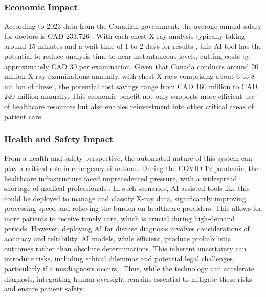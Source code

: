 \documentclass[12pt]{article}
\begin{document}
\subsubsection{Economic Impact}
According to 2023 data from the Canadian government, the average annual salary for doctors is CAD 233,726 \cite{2}. With each chest X-ray analysis typically taking around 15 minutes and a wait time of 1 to 2 days for results \cite{1}, this AI tool has the potential to reduce analysis time to near-instantaneous levels, cutting costs by approximately CAD 30 per examination. Given that Canada conducts around 20 million X-ray examinations annually, with chest X-rays comprising about 6 to 8 million of these \cite{3}, the potential cost savings range from CAD 160 million to CAD 240 million annually. This economic benefit not only supports more efficient use of healthcare resources but also enables reinvestment into other critical areas of patient care.

\subsubsection{Health and Safety Impact}
From a health and safety perspective, the automated nature of this system can play a critical role in emergency situations. During the COVID-19 pandemic, the healthcare infrastructure faced unprecedented pressure, with a widespread shortage of medical professionals \cite{4}. In such scenarios, AI-assisted tools like this could be deployed to manage and classify X-ray data, significantly improving processing speed and relieving the burden on healthcare providers. This allows for more patients to receive timely care, which is crucial during high-demand periods.
\newline
However, deploying AI for disease diagnosis involves considerations of accuracy and reliability. AI models, while efficient, produce probabilistic outcomes rather than absolute determinations. This inherent uncertainty can introduce risks, including ethical dilemmas and potential legal challenges, particularly if a misdiagnosis occurs \cite{5}. Thus, while the technology can accelerate diagnosis, integrating human oversight remains essential to mitigate these risks and ensure patient safety.
\end{document}
